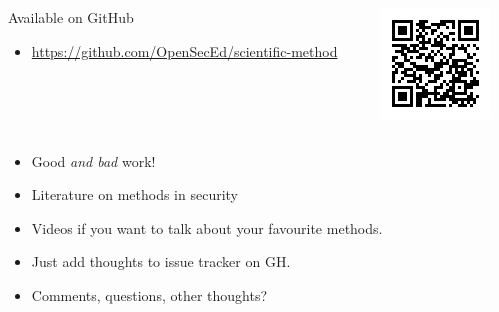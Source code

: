 \begin{frame}[fragile]
  \begin{columns}
    \begin{column}{0.7\columnwidth}
      \begin{block}{Available on GitHub}
        \begin{itemize}
          \item \url{https://github.com/OpenSecEd/scientific-method}
        \end{itemize}
      \end{block}
    \end{column}
    \begin{column}{0.3\columnwidth}
      \includegraphics[width=\columnwidth]{figs/GHurl.png}
    \end{column}
  \end{columns}

  \begin{remark}[Contributions]
    \begin{itemize}
      \item Good \emph{and bad} work!
      \item Literature on methods in security
      \item Videos if you want to talk about your favourite methods.
      \item Just add thoughts to issue tracker on GH.
    \end{itemize}
  \end{remark}
\end{frame}

\begin{frame}
  \begin{question}
    \begin{itemize}
      \item Comments, questions, other thoughts?
    \end{itemize}
  \end{question}
\end{frame}



\begin{frame}[allowframebreaks]
  \printbibliography
\end{frame}

